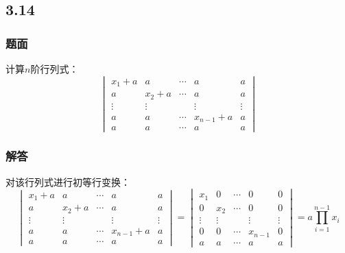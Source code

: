 \documentclass[10pt,xcolor=svgnames]{beamer} %
\begin{document}
\subsection*{3.14}
\begin{frame}
    \frametitle{题面}
    计算\(n\)阶行列式：
    \begin{equation*}
        \begin{vmatrix}
            x_{1}+a & a       & \cdots & a         & a      \\
            a       & x_{2}+a & \cdots & a         & a      \\
            \vdots  & \vdots  &        & \vdots    & \vdots \\
            a       & a       & \cdots & x_{n-1}+a & a      \\
            a       & a       & \cdots & a         & a
        \end{vmatrix}
    \end{equation*}
\end{frame}
\begin{frame}
    \frametitle{解答}
    对该行列式进行初等行变换：
    \begin{equation*}
        \begin{vmatrix}
            x_{1}+a & a       & \cdots & a         & a      \\
            a       & x_{2}+a & \cdots & a         & a      \\
            \vdots  & \vdots  &        & \vdots    & \vdots \\
            a       & a       & \cdots & x_{n-1}+a & a      \\
            a       & a       & \cdots & a         & a
        \end{vmatrix}=
        \begin{vmatrix}
            x_{1}  & 0      & \cdots & 0       & 0      \\
            0      & x_{2}  & \cdots & 0       & 0      \\
            \vdots & \vdots &        & \vdots  & \vdots \\
            0      & 0      & \cdots & x_{n-1} & 0      \\
            a      & a      & \cdots & a       & a
        \end{vmatrix}=a\prod_{i=1}^{n-1}x_i
    \end{equation*}
\end{frame}
\end{document}
